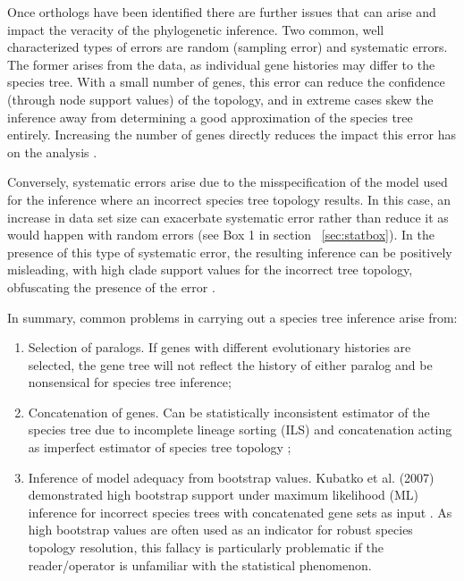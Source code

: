 \documentclass[12pt]{article}
\begin{document}
Once orthologs have been identified there are further issues that can arise and impact the veracity of the phylogenetic inference.
Two common, well characterized types of errors are random (sampling error) and systematic errors. 
The former arises from the data, as individual gene histories may differ to the species tree. 
With a small number of genes, this error can reduce the confidence (through node support values) of the topology, and in extreme cases skew the inference away from determining a good approximation of the species tree entirely. 
Increasing the number of genes directly reduces the impact this error has on the analysis \cite{philippe2004phylogenomics,heath2008taxon}. 

Conversely, systematic errors arise due to the misspecification of the model used for the inference where an incorrect species tree topology results. 
In this case, an increase in data set size can exacerbate systematic error rather than reduce it as would happen with random errors (see Box 1 in section ~\ref{sec:statbox}). 
In the presence of this type of systematic error, the resulting inference can be positively misleading,
 with high clade support values for the incorrect tree topology, obfuscating the presence of the error \cite{jeffroy2006phylogenomics,roch2015likelihood,kubatko2007inconsistency}. 

In summary, common problems in carrying out a species tree inference arise from:\\
\begin{enumerate}
\item Selection of paralogs. 
If genes with different evolutionary histories are selected, the gene tree will not reflect the history of either paralog and be nonsensical for species tree inference;
\item Concatenation of genes. 
Can be statistically inconsistent estimator of the species tree due to incomplete lineage sorting (ILS) and concatenation acting as imperfect estimator of species tree topology \cite{roch2015likelihood};
\item Inference of model adequacy from bootstrap values. 
Kubatko et al. (2007) demonstrated high bootstrap support under maximum likelihood (ML) inference for incorrect species trees with concatenated gene sets as input \cite{kubatko2007inconsistency}. 
As high bootstrap values are often used as an indicator for robust species topology resolution, this fallacy is particularly problematic if the reader/operator is unfamiliar with the statistical phenomenon.
\end{enumerate}
\end{document}
